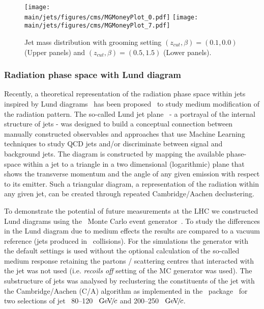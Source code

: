 %
\begin{figure}[!ht]
\begin{center}
\texttt{[image: \\main/jets/figures/cms/MGMoneyPlot\_0.pdf]}
\texttt{[image: \\main/jets/figures/cms/MGMoneyPlot\_7.pdf]}
\caption{Jet mass distribution with grooming setting $(z_{cut},\beta)=(0.1,0.0)$ (Upper panels) and $(z_{cut},\beta)=(0.5,1.5)$ (Lower panels).~\cite{CMS-FTR-17-002:2017dec}}
\label{fig:Mass}
\end{center}
\end{figure}


\newpage
\subsubsection{Radiation phase space with Lund diagram}

Recently, a theoretical representation of the radiation phase space within jets inspired by Lund diagrams~\cite{Andersson:1988gp} has been proposed~\cite{Andrews:2018jcm} to study medium modification of the radiation pattern. The so-called Lund jet plane~\cite{Dreyer:2018nbf} - a portrayal of the internal structure of jets - was designed to build a conceptual connection between manually constructed observables and approaches that use Machine Learning techniques to study QCD jets and/or discriminate between signal and background jets.
The diagram is constructed by mapping the available phase-space within a jet to a triangle in a two dimensional (logarithmic) plane that shows the transverse momentum and the angle of any given emission with respect to its emitter.
Such a triangular diagram, a representation of the radiation within any given jet, can be created through repeated Cambridge/Aachen declustering.

To demonstrate the potential of future measurements at the LHC we constructed Lund diagrams using the \jewel\ Monte Carlo event generator~\cite{Zapp:2013vla}.
To study the differences in the Lund diagram due to medium effects the results are compared to a vacuum reference (jets produced in \pp\ collisions). For the simulations the \jewel
 generator with the default settings is used without the optional calculation of the so-called medium response retaining the partons / scattering centres that interacted with the jet was not used (i.e. {\it recoils off} setting of the MC generator was used).
The substructure of jets was analysed by reclustering the constituents of the jet with the Cambridge/Aachen (C/A) algorithm as implemented in the \fastjet\ package~\cite{Cacciari:2011ma,Cacciari:2005hq} for two selections of jet \pt\ 80--120~$~\text{GeV}\!/\mspace{-2mu}c$ and 200--250~$~\text{GeV}\!/\mspace{-2mu}c$.

